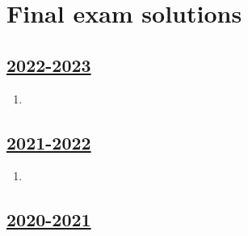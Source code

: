 
\newpage
\thispagestyle{empty}
\section{Final exam solutions}
 


\subsection[2022-2023]{\hyperref[sec:kr_04_2022_2023]{2022-2023}}
\label{sec:sol_kr_04_2022_2023} %



\begin{enumerate}

\item 


\end{enumerate}
    


\subsection[2021-2022]{\hyperref[sec:kr_04_2021_2022]{2021-2022}}
\label{sec:sol_kr_04_2021_2022} %



\begin{enumerate}

\item 


\end{enumerate}
    

\subsection[2020-2021]{\hyperref[sec:kr_04_2020_2021]{2020-2021}}
\label{sec:sol_kr_04_2020_2021} %


